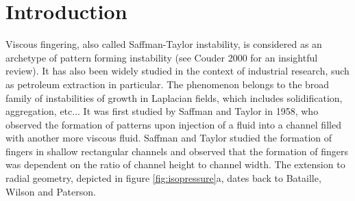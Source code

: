 \documentclass[aip,preprint,jmp,showpacs,showkeys]{revtex4-1}
\begin{document}

\maketitle %


\section{Introduction}

Viscous fingering, also called Saffman-Taylor\cite{SaffmanTaylor58} instability, is considered as an archetype of pattern forming instability (see Couder 2000\cite{couder2000} for an insightful review). It has also been widely studied in the context of industrial research, such as petroleum extraction in particular. The phenomenon belongs to the broad family of instabilities of growth in Laplacian fields, which includes solidification, aggregation, etc... It was first studied by Saffman and Taylor\cite{SaffmanTaylor58} in 1958, who observed the formation of patterns upon injection of a fluid into a channel filled with another more viscous fluid. Saffman and Taylor\cite{SaffmanTaylor58} studied the formation of fingers in shallow rectangular channels and observed that the formation of fingers was dependent on the ratio of channel height to channel width. The extension to radial geometry, depicted in figure \ref{fig:isopressure}a, dates back to Bataille\cite{Bataille68}, Wilson\cite{Wilson75} and Paterson\cite{Paterson81}.
\end{document}
